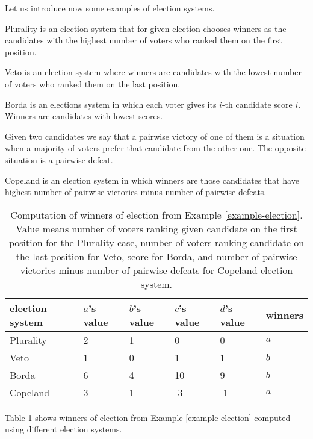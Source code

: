 Let us introduce now some examples of election systems.

Plurality is an election system that for given election chooses winners as the candidates
with the highest number of voters who ranked them on the first position.

Veto is an election system where winners are candidates with
the lowest number of voters who ranked them on the last position.

Borda is an elections system in which each voter gives its $i$-th candidate score $i$.
Winners are candidates with lowest scores.

Given two candidates we say that a pairwise victory of one of them
is a situation when a majority of voters prefer that candidate from the other one.
The opposite situation is a pairwise defeat.

Copeland is an election system in which winners are those candidates that have
highest number of pairwise victories minus number of pairwise defeats.

\begin{table}[h] \centering
\begin{tabular}{| l | l | l | l | l | l |} \hline
    election system	& $a$'s value	& $b$'s value	& $c$'s value	& $d$'s value	& winners \\ \hline
	Plurality 		& 2				& 1				& 0				& 0				& $a$ \\ \hline
	Veto			& 1				& 0				& 1				& 1				& $b$ \\ \hline
	Borda	 		& 6				& 4				& 10			& 9				& $b$ \\ \hline
	Copeland		& 3				& 1				& -3			& -1			& $a$ \\ \hline
\end{tabular}
\caption{Computation of winners of election from Example \ref{example-election}.
Value means number of voters ranking given candidate on the first position for the Plurality case,
number of voters ranking candidate on the last position for Veto,
score for Borda,
and number of pairwise victories minus number of pairwise defeats for Copeland election system.} \label{example-winners}
\end{table}

Table \ref{example-winners} shows winners of election from Example \ref{example-election}
computed using different election systems.

